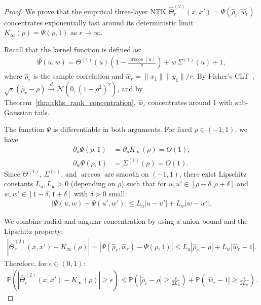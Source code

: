 \begin{proof}
We prove that the empirical three-layer NTK \( \hat{\Theta}^{(2)}_r(x,x') = \Psi(\hat{\rho}_r, \hat{w}_r) \) concentrates exponentially fast around its deterministic limit \( K_{\infty}(\rho) = \Psi(\rho, 1) \) as \( r \to \infty \).


Recall that the kernel function is defined as:
\begin{align}
\Psi(u,w) = \Theta^{(1)}(u)\!\left(1-\frac{\arccos(u)}{\pi}\right) + w\,\Sigma^{(1)}(u) + 1,
\end{align}
where \( \hat{\rho}_r \) is the sample correlation and \( \hat{w}_r = \|x_1\|\|y_1\|/r \). By Fisher's CLT~\cite{fisher1915probable,hotelling1953new}, \( \sqrt{r}(\hat{\rho}_r - \rho) \xrightarrow{d} \mathcal{N}(0, (1-\rho^2)^2) \), and by Theorem~\ref{thm:rkhs_rank_concentration}, \( \hat{w}_r \) concentrates around 1 with sub-Gaussian tails.


The function \( \Psi \) is differentiable in both arguments. For fixed \( \rho \in (-1,1) \), we have:
\begin{align}
\partial_u \Psi(\rho,1) &= \partial_\rho K_{\infty}(\rho) = O(1), \\
\partial_w \Psi(\rho,1) &= \Sigma^{(1)}(\rho) = O(1).
\end{align}
Since \( \Theta^{(1)} \), \( \Sigma^{(1)} \), and \( \arccos \) are smooth on \( (-1,1) \), there exist Lipschitz constants \( L_u, L_w > 0 \) (depending on \( \rho \)) such that for \( u, u' \in [\rho-\delta, \rho+\delta] \) and \( w, w' \in [1-\delta, 1+\delta] \) with \( \delta > 0 \) small:
\begin{align}
|\Psi(u,w) - \Psi(u',w')| \le L_u|u-u'| + L_w|w-w'|.
\end{align}

We combine radial and angular concentration by using a union bound and the Lipschitz property:
\begin{align}
|\hat{\Theta}^{(2)}_r(x,x') - K_{\infty}(\rho)| = |\Psi(\hat{\rho}_r, \hat{w}_r) - \Psi(\rho, 1)| \le L_u|\hat{\rho}_r - \rho| + L_w|\hat{w}_r - 1|.
\end{align}
Therefore, for \( \epsilon \in (0,1) \):
\begin{align}
\mathbb{P}\!\left(|\hat{\Theta}^{(2)}_r(x,x') - K_{\infty}(\rho)| \ge \epsilon\right) \le \mathbb{P}\!\left(|\hat{\rho}_r - \rho| \ge \frac{\epsilon}{2L_u}\right) + \mathbb{P}\!\left(|\hat{w}_r - 1| \ge \frac{\epsilon}{2L_w}\right).
\end{align}


\end{proof}
